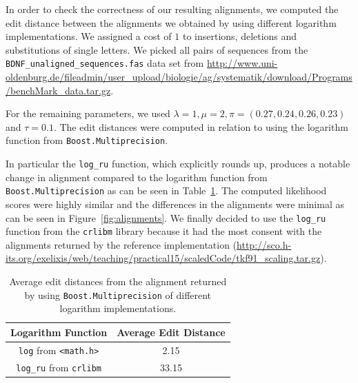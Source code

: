 \documentclass[runningheads,a4paper]{llncs}
\begin{document}
In order to check the correctness of our resulting alignments, we computed the edit distance between the alignments we obtained by using different logarithm implementations. We assigned a cost of $1$ to insertions, deletions and substitutions of single letters. We picked all pairs of sequences from the \\ \texttt{BDNF\_unaligned\_sequences.fas} data set from \url{http://www.uni-oldenburg.de/fileadmin/user_upload/biologie/ag/systematik/download/Programs/benchMark_data.tar.gz}.

For the remaining parameters, we used $\lambda=1, \mu=2, \pi = (0.27, 0.24, 0.26,0.23)$ and $\tau = 0.1$. The edit distances were computed in relation to using the logarithm function from \texttt{Boost.Multiprecision}. 

In particular the \texttt{log\_ru} function, which explicitly rounds up, produces a notable change in alignment compared to the logarithm function from \\ \texttt{Boost.Multiprecision} as can be seen in Table~\ref{fig:dist}. The computed likelihood scores were highly similar and the differences in the alignments were minimal as can be seen in Figure~\ref{fig:alignments}. We finally decided to use the \texttt{log\_ru} function from the \texttt{crlibm} library because it had the most consent with the alignments returned by the reference implementation (\url{http://sco.h-its.org/exelixis/web/teaching/practical15/scaledCode/tkf91_scaling.tar.gz}).

\begin{table}[h!]

\centering

\begin{tabular}{|c|c|}
\hline 
Logarithm Function & Average Edit Distance \\ 
\hline 
\texttt{log} from \texttt{<math.h>} & 2.15 \\ 
\hline 
\texttt{log\_ru} from \texttt{crlibm} & 33.15 \\ 
\hline 
\end{tabular} 
\caption{Average edit distances from the alignment returned by using  \texttt{Boost.Multiprecision} of different logarithm implementations.}
\label{fig:dist}
\end{table}
\end{document}
